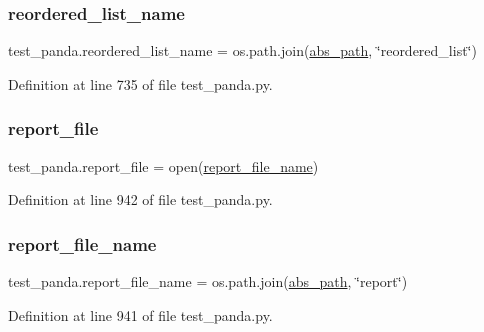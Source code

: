\subsubsection{\texorpdfstring{reordered\+\_\+list\+\_\+name}{reordered\_list\_name}}
{\footnotesize\ttfamily test\+\_\+panda.\+reordered\+\_\+list\+\_\+name = os.\+path.\+join(\hyperlink{namespacetest__panda_a78bb23566d04ac65a03195681449d2c0}{abs\+\_\+path}, \char`\"{}reordered\+\_\+list\char`\"{})}



Definition at line 735 of file test\+\_\+panda.\+py.

\mbox{\label{namespacetest__panda_a551ac2c557ec037c86d5b57afd171c4e}} 
\subsubsection{\texorpdfstring{report\+\_\+file}{report\_file}}
{\footnotesize\ttfamily test\+\_\+panda.\+report\+\_\+file = open(\hyperlink{namespacetest__panda_aabd37b93c7c0271be629a4c86bfa7813}{report\+\_\+file\+\_\+name})}



Definition at line 942 of file test\+\_\+panda.\+py.

\mbox{\label{namespacetest__panda_aabd37b93c7c0271be629a4c86bfa7813}} 
\subsubsection{\texorpdfstring{report\+\_\+file\+\_\+name}{report\_file\_name}}
{\footnotesize\ttfamily test\+\_\+panda.\+report\+\_\+file\+\_\+name = os.\+path.\+join(\hyperlink{namespacetest__panda_a78bb23566d04ac65a03195681449d2c0}{abs\+\_\+path}, \char`\"{}report\char`\"{})}



Definition at line 941 of file test\+\_\+panda.\+py.

\mbox{\label{namespacetest__panda_ac89fb7442391f9c56e37c5753f364a5d}} 
